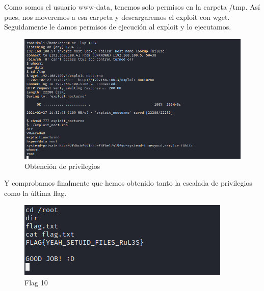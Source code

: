 \documentclass[12pt,twoside]{article}
\begin{document}
Como somos el usuario www-data, tenemos solo permisos en la carpeta /tmp. Así pues, nos moveremos a esa carpeta y descargaremos el exploit con wget. Seguidamente le damos permisos de ejecución  al exploit y lo ejecutamos.

\begin{figure}[h]
    \centering
    \includegraphics[scale=0.5]{./imagenes/ejecucion_exploit}
    \caption{Obtención de privilegios}
\end{figure}

Y comprobamos finalmente que hemos obtenido tanto la escalada de privilegios como la última flag.

\begin{figure}[h]
    \centering
    \includegraphics[scale=0.7]{./imagenes/flag_root}
    \caption{Flag 10}
\end{figure}





\end{document}
